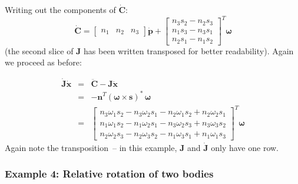 Writing out the components of $\dot{\mathbf{C}}$:
\begin{equation}
\dot{\mathbf{C}} = \left[\begin{array}{ccc} n_1 & n_2 & n_3 \end{array}\right] \dot{\mathbf{p}} +
    \left[\begin{array}{c}
    n_3 s_2 - n_2 s_3 \\
    n_1 s_3 - n_3 s_1 \\
    n_2 s_1 - n_1 s_2 \end{array}\right]^T \bm{\omega}
\end{equation}
(the second slice of $\mathbf{J}$ has been written transposed for better readability). Again
we proceed as before:

\begin{eqnarray}
\dot{\mathbf{J}}\dot{\mathbf{x}} & = & \ddot{\mathbf{C}} - \mathbf{J}\ddot{\mathbf{x}} \nonumber\\
&=& -\mathbf{n}^T (\bm{\omega}\times\mathbf{s})^*\,\bm{\omega} \nonumber\\
&=& \left[\begin{array}{c}
    n_3 \omega_1 s_2 - n_3 \omega_2 s_1 - n_2 \omega_1 s_2 + n_2 \omega_2 s_1 \\
    n_1 \omega_1 s_2 - n_1 \omega_2 s_1 - n_3 \omega_2 s_3 + n_3 \omega_3 s_2 \\
    n_2 \omega_2 s_3 - n_2 \omega_3 s_2 - n_1 \omega_3 s_1 + n_1 \omega_1 s_3
    \end{array}\right]^T \bm{\omega}
\end{eqnarray}
Again note the transposition~-- in this example, $\mathbf{J}$ and $\dot{\mathbf{J}}$ only
have one row.

\subsubsection{Example 4: Relative rotation of two bodies}

